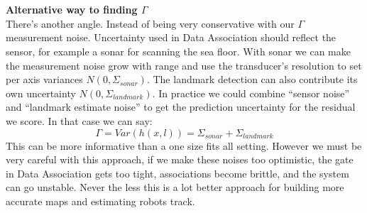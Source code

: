 \\ \\
\textbf{Alternative way to finding $\Gamma$} 
\\ \noindent
There's another angle. Instead of being very conservative with our $\Gamma$ measurement noise. Uncertainty used in Data Association should reflect the sensor, for example a sonar for scanning the sea floor. With sonar we can make the measurement noise grow with range and use the transducer's resolution to set per axis variances $N(0, \Sigma_{sonar})$. The landmark detection can also contribute its own uncertainty $N(0, \Sigma_{landmark})$. In practice we could combine ``sensor noise'' and ``landmark estimate noise'' to get the prediction uncertainty for the residual we score. In that case we can say:
$$
    \Gamma = Var(h(x, l)) = \Sigma_{sonar} + \Sigma_{landmark}
$$
This can be more informative than a one size fits all setting. However we must be very careful with this approach, if we make these noises too optimistic, the gate in Data Association gets too tight, associations become brittle, and the system can go unstable. Never the less this is a lot better approach for building more accurate maps and estimating robots track.



